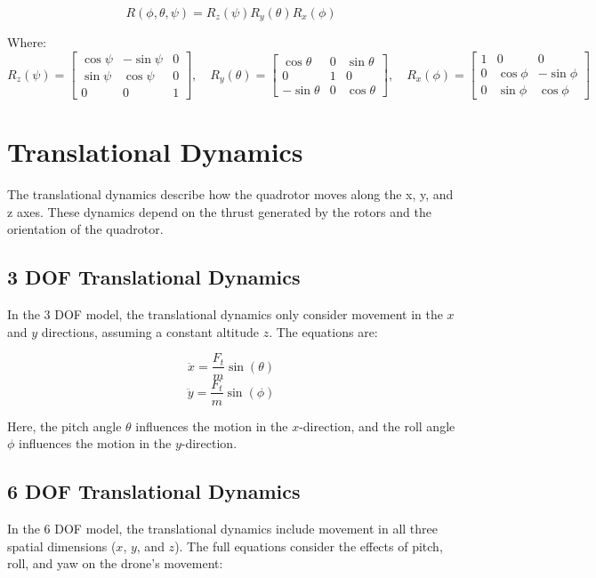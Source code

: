 \documentclass[a4paper,12pt]{report}
\begin{document}
\[
    R(\phi, \theta, \psi) = R_z(\psi)R_y(\theta)R_x(\phi)
\]

Where:
\[
    R_z(\psi) = \begin{bmatrix}
        \cos \psi & -\sin \psi & 0 \\
        \sin \psi & \cos \psi  & 0 \\
        0         & 0          & 1
    \end{bmatrix}, \quad
    R_y(\theta) = \begin{bmatrix}
        \cos \theta  & 0 & \sin \theta \\
        0            & 1 & 0           \\
        -\sin \theta & 0 & \cos \theta
    \end{bmatrix}, \quad
    R_x(\phi) = \begin{bmatrix}
        1 & 0         & 0          \\
        0 & \cos \phi & -\sin \phi \\
        0 & \sin \phi & \cos \phi
    \end{bmatrix}
\]

\section{Translational Dynamics}
The translational dynamics describe how the quadrotor moves along the x, y, and z axes. These dynamics depend on the thrust generated by the rotors and the orientation of the quadrotor.

\subsection{3 DOF Translational Dynamics}
In the 3 DOF model, the translational dynamics only consider movement in the \(x\) and \(y\) directions, assuming a constant altitude \(z\). The equations are:

\[
    \ddot{x} = \frac{F_t}{m} \sin(\theta)
\]
\[
    \ddot{y} = \frac{F_t}{m} \sin(\phi)
\]

Here, the pitch angle \(\theta\) influences the motion in the \(x\)-direction, and the roll angle \(\phi\) influences the motion in the \(y\)-direction.

\subsection{6 DOF Translational Dynamics}
In the 6 DOF model, the translational dynamics include movement in all three spatial dimensions (\(x\), \(y\), and \(z\)). The full equations consider the effects of pitch, roll, and yaw on the drone's movement:
\end{document}
